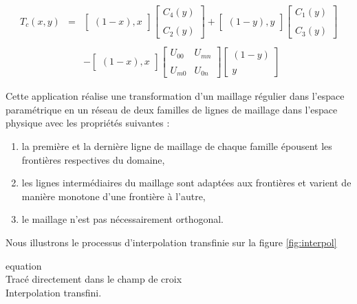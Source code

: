 \begin{eqnarray}
T_c(x,y)&=&
\begin{bmatrix}
(1-x),x
\end{bmatrix}
\begin{bmatrix}
C_4(y)\\\\
C_2(y)
\end{bmatrix}
+
\begin{bmatrix}
(1-y),y
\end{bmatrix}
\begin{bmatrix}
C_1(y)\\\\
C_3(y)
\end{bmatrix}\nonumber\\\nonumber\\
&&-
\begin{bmatrix}
(1-x),x
\end{bmatrix}
\begin{bmatrix}
U_{00}&U_{mn}\\\\
U_{m0}&U_{0n}
\end{bmatrix}
\begin{bmatrix}
(1-y)\\\\
y
\end{bmatrix}
\label{appli}
\end{eqnarray}

Cette application réalise une transformation d'un maillage régulier dans l’espace paramétrique en un réseau de deux familles de lignes de maillage dans l’espace physique avec les propriétés suivantes :
\begin{enumerate}
\item la première et la dernière ligne de maillage de chaque famille épousent les frontières respectives du domaine,
\item les lignes intermédiaires du maillage sont adaptées aux frontières et varient de manière monotone d’une frontière à l’autre,
\item le maillage n’est pas nécessairement orthogonal.
\end{enumerate}
Nous illustrons le processus d'interpolation transfinie sur la figure \ref{fig:interpol}

equation\\
Tracé directement dans le champ de croix\\
Interpolation transfini.

